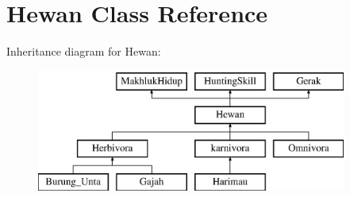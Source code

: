 \hypertarget{class_hewan}{}\section{Hewan Class Reference}
\label{class_hewan}
Inheritance diagram for Hewan\+:\begin{figure}[H]
\begin{center}
\leavevmode
\includegraphics[height=4.000000cm]{class_hewan}
\end{center}
\end{figure}
